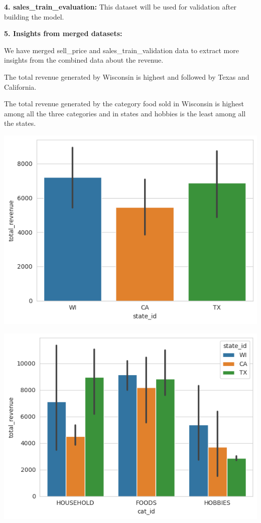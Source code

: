 \documentclass[fleqn,10pt]{SelfArx} %
\begin{document}
\item \textbf{4. sales\_train\_evaluation:}
This dataset will be used for validation after building the model.

\item \textbf{5. Insights from merged datasets:}
\item We have merged sell\_price and sales\_train\_validation data to extract more insights from the combined data about the revenue.
\item The total revenue generated by Wisconsin is highest and followed by Texas and California.
\item The total revenue generated by the category food sold in Wisconsin is highest among all the three categories and in states and hobbies is the least among all the states.

\includegraphics[scale=0.5]{41.png}

\includegraphics[scale=0.5]{42.png}
\end{document}

